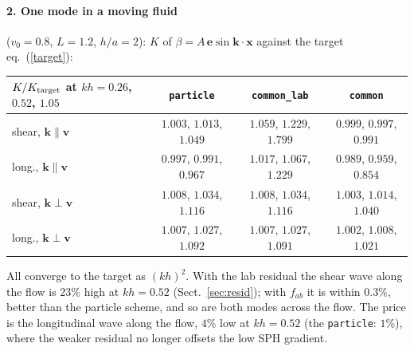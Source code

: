 \documentclass[11pt,aps,preprint,nofootinbib,superscriptaddress,tightenlines]{revtex4-2}
\def\Eq#1{eq.~(\ref{#1})}
\def\Sect#1{Sect.~\ref{#1}}
\let\oldparagraph\paragraph
\renewcommand{\paragraph}{\par\bigskip\oldparagraph}
\begin{document}
\paragraph{2. One mode in a moving fluid} ($v_0=0.8$, $L=1.2$, $h/a=2$): $K$ of $\beta=A\,\bm e\sin\bm k\cdot\bm x$ against the target
\Eq{target}:
\begin{center}
\begin{tabular}{lccc}
\hline
$K/K_{\rm target}$ at $kh=0.26$, $0.52$, $1.05$ & \texttt{particle} & \texttt{common\_lab} & \texttt{common} \\ \hline
shear, $\bm k\parallel\bm v$ & $1.003$, $1.013$, $1.049$ & $1.059$, $1.229$, $1.799$ & $0.999$, $0.997$, $0.991$ \\
long., $\bm k\parallel\bm v$ & $0.997$, $0.991$, $0.967$ & $1.017$, $1.067$, $1.229$ & $0.989$, $0.959$, $0.854$ \\
shear, $\bm k\perp\bm v$ & $1.008$, $1.034$, $1.116$ & $1.008$, $1.034$, $1.116$ & $1.003$, $1.014$, $1.040$ \\
long., $\bm k\perp\bm v$ & $1.007$, $1.027$, $1.092$ & $1.007$, $1.027$, $1.091$ & $1.002$, $1.008$, $1.021$ \\
\hline
\end{tabular}
\end{center}
All converge to the target as $(kh)^2$.  With the lab residual the shear wave along the flow is $23\%$ high at
$kh=0.52$ (\Sect{sec:resid}); with $f_{ab}$ it is within $0.3\%$, better than the particle scheme, and so are both
modes across the flow.  The price is the longitudinal wave along the flow, $4\%$ low at $kh=0.52$ (the
\texttt{particle}: $1\%$), where the weaker residual no longer offsets the low SPH gradient.
\end{document}
